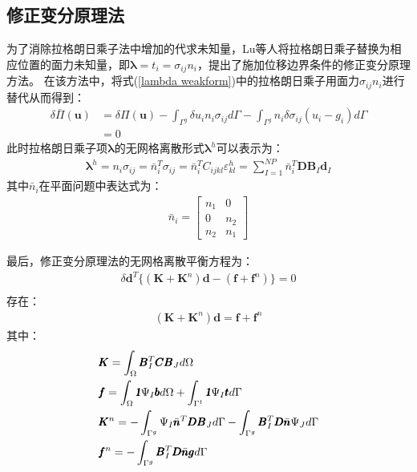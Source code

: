 \subsection{修正变分原理法}
为了消除拉格朗日乘子法中增加的代求未知量，Lu等人将拉格朗日乘子替换为相应位置的面力未知量，即$\pmb{\lambda}=t_i=\sigma_{ij}n_i$，提出了施加位移边界条件的修正变分原理方法。
在该方法中，将式(\ref{lambda weakform})中的拉格朗日乘子用面力$\sigma_{ij}n_i$进行替代从而得到：
\begin{equation}
\begin{split}
    \delta\bar{\Pi}(\pmb{u})&=\delta\Pi(\pmb{u})-\int_{\Gamma^g}\delta u_in_i\sigma_{ij}d\Gamma-\int_{\Gamma^g}n_i\delta\sigma_{ij}(u_i-g_i)d\Gamma\\
    &=0
\end{split}
\end{equation}
此时拉格朗日乘子项$\pmb{\lambda}$的无网格离散形式$\pmb{\lambda}^h$可以表示为：
\begin{equation}
\begin{split}
    \pmb{\lambda}^h=n_i\sigma_{ij}=\bar{n}_i^T\sigma_{ij}=\bar{n}_i^TC_{ijkl}\varepsilon^h_{kl}=\sum_{I=1}^{N\!P}\bar{n}_i^T\pmb{D}\pmb{B}_I\pmb{d}_I
\end{split}
\end{equation}
其中$\bar{n}_i$在平面问题中表达式为：
\begin{equation}
\begin{split}
    \bar{n}_i=\left[\begin{matrix}n_1&0\\0&n_2\\n_2&n_1
    \end{matrix}\right]
\end{split}
\end{equation}\par
最后，修正变分原理法的无网格离散平衡方程为：
\begin{equation}
\begin{split}
   \delta\pmb{d}^T\{(\pmb{K}+\pmb{K}^n)\pmb{d}-(\pmb{f}+\pmb{f}^n)\}=0\\
\end{split}
\end{equation}
存在：
\begin{equation}
\begin{split}
    (\pmb{K}+\pmb{K}^n)\pmb{d}=\pmb{f}+\pmb{f}^n
\end{split}
\end{equation}
其中：
\begin{equation}
\begin{split}
&\pmb K=\int_{\Omega}\pmb{B}_I^T\pmb{C}\pmb{B}_Jd\Omega\\
&\pmb f=\int_{\Omega}\pmb{\textsl{1}}\Psi_I\pmb{b}d\Omega+\int_{\Gamma^t}\pmb{\textsl{1}}\Psi_I\pmb{t}d\Gamma\\
&\pmb K^n=-\int_{\Gamma^g}\Psi_I\bar{\pmb{n}}^T\pmb{D}\pmb{B}_Jd\Gamma-\int_{\Gamma^g}\pmb{B}_I^T\pmb{D}\bar{\pmb{n}}\Psi_Jd\Gamma\\
&\pmb f^n=-\int_{\Gamma^g}\pmb{B}_I^T\pmb{D}\bar{\pmb{n}}\pmb{g}d\Gamma
\end{split}
\end{equation}\par
